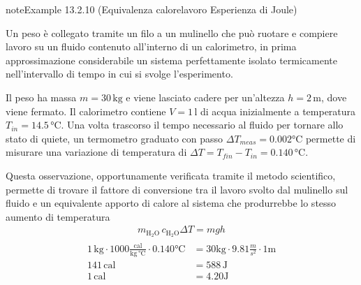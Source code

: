 \documentclass[letterpaper,10pt,italian]{jupyterBook}
\begin{document}
\begin{sphinxadmonition}{note}{Example 13.2.10 (Equivalenza calore\sphinxhyphen{}lavoro \sphinxhyphen{} Esperienza di Joule)}



\sphinxAtStartPar
Un peso è collegato tramite un filo a un mulinello che può ruotare e compiere lavoro su un fluido contenuto all’interno di un calorimetro, in prima approssimazione considerabile un sistema perfettamente isolato termicamente nell’intervallo di tempo in cui si svolge l’esperimento.

\sphinxAtStartPar
Il peso ha massa \(m = 30 \, \text{kg}\) e viene lasciato cadere per un’altezza \(h = 2 \, \text{m}\), dove viene fermato. Il calorimetro contiene \(V = 1 \, \text{l}\) di acqua inizialmente a temperatura \(T_{in} = 14.5 \, \text{°C}\). Una volta trascorso il tempo necessario al fluido per tornare allo stato di quiete, un termometro graduato con passo \(\Delta T_{meas} = 0.002 \text{°C}\) permette di misurare una variazione di temperatura di \(\Delta T = T_{fin} - T_{in} = 0.140 \, \text{°C}\).

\sphinxAtStartPar
Questa osservazione, opportunamente verificata tramite il metodo scientifico, permette di trovare il fattore di conversione tra il lavoro svolto dal mulinello sul fluido e un equivalente apporto di calore al sistema che produrrebbe lo stesso aumento di temperatura
\begin{equation*}
\begin{split}m_{\text{H$_2$O}} \, c_{\text{H$_2$O}} \Delta T = m g h\end{split}
\end{equation*}\begin{equation*}
\begin{split}\begin{aligned}
  1 \, \text{kg} \cdot 1000 \frac{\text{cal}}{\text{kg} \, \text{°C}} \cdot 0.140 \text{°C} & = 30 \text{kg} \cdot 9.81 \frac{m}{s^2} \cdot 1 \text{m} \\
  141 \, \text{cal} & = 588 \, \text{J} \\
  1 \, \text{cal} & = 4.20 \text{J}
\end{aligned}\end{split}
\end{equation*}\end{sphinxadmonition}
\label{ch/thermodynamics/foundation-experiments:thermodynamics:history:heat-work:second}
\end{document}
